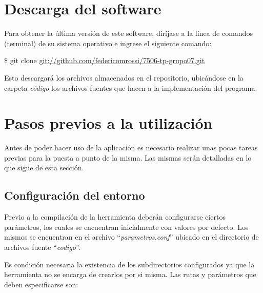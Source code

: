 \documentclass{article}
\begin{document}
\section{Descarga del software}

	Para obtener la última versión de este software, diríjase a la línea de comandos (terminal) de su sistema operativo e ingrese el siguiente comando:
	\bigskip

	\colorbox{gray95}{{\ttfamily\footnotesize
	\$ git clone \url{git://github.com/federicomrossi/7506-tp-grupo07.git}\\}}
	\bigskip

	Esto descargará los archivos almacenados en el repositorio, ubicándose en la carpeta \textit{código} los archivos fuentes que hacen a la implementación del programa.
\bigskip\medskip




\section{Pasos previos a la utilización}

	Antes de poder hacer uso de la aplicación es necesario realizar unas pocas tareas previas para la puesta a punto de la misma. Las mismas serán detalladas en lo que sigue de esta sección.
	\bigskip



\subsection{Configuración del entorno}

	Previo a la compilación de la herramienta deberán configurarse ciertos parámetros, los cuales se encuentran inicialmente con valores por defecto. Los mismos se encuentran en el archivo ``\textit{parametros.conf}'' ubicado en el directorio de archivos fuente ``\textit{codigo}''.
	\par
	Es condición necesaria la existencia de los subdirectorios configurados ya que la herramienta no se encarga de crearlos por si misma. Las rutas y parámetros que deben especificarse son:
	\medskip
\end{document}
